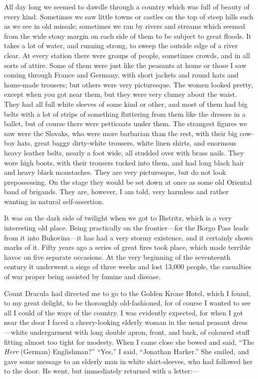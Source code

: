 \documentclass{article}
\begin{document}
				All day long we seemed to dawdle through a country which was full of beauty of every kind. Sometimes we saw little towns or castles on the top of steep hills such as we see in old missals; sometimes we ran by rivers and streams which seemed from the wide stony margin on each side of them to be subject to great floods. It takes a lot of water, and running strong, to sweep the outside edge of a river clear. At every station there were groups of people, sometimes crowds, and in all sorts of attire. Some of them were just like the peasants at home or those I saw coming through France and Germany, with short jackets and round hats and home-made trousers; but others were very picturesque. The women looked pretty, except when you got near them, but they were very clumsy about the waist. They had all full white sleeves of some kind or other, and most of them had big belts with a lot of strips of something fluttering from them like the dresses in a ballet, but of course there were petticoats under them. The strangest figures we saw were the Slovaks, who were more barbarian than the rest, with their big cow-boy hats, great baggy dirty-white trousers, white linen shirts, and enormous heavy leather belts, nearly a foot wide, all studded over with brass nails. They wore high boots, with their trousers tucked into them, and had long black hair and heavy black moustaches. They are very picturesque, but do not look prepossessing. On the stage they would be set down at once as some old Oriental band of brigands. They are, however, I am told, very harmless and rather wanting in natural self-assertion.\par\bigskip
				
				It was on the dark side of twilight when we got to Bistritz, which is a very interesting old place. Being practically on the frontier—for the Borgo Pass leads from it into Bukovina—it has had a very stormy existence, and it certainly shows marks of it. Fifty years ago a series of great fires took place, which made terrible havoc on five separate occasions. At the very beginning of the seventeenth century it underwent a siege of three weeks and lost 13,000 people, the casualties of war proper being assisted by famine and disease.\par\bigskip
				
				Count Dracula had directed me to go to the Golden Krone Hotel, which I found, to my great delight, to be thoroughly old-fashioned, for of course I wanted to see all I could of the ways of the country. I was evidently expected, for when I got near the door I faced a cheery-looking elderly woman in the usual peasant dress—white undergarment with long double apron, front, and back, of coloured stuff fitting almost too tight for modesty. When I came close she bowed and said, “The \textit{Herr} (German) Englishman?” “Yes,” I said, “Jonathan Harker.” She smiled, and gave some message to an elderly man in white shirt-sleeves, who had followed her to the door. He went, but immediately returned with a letter:—\par\bigskip
				
\end{document}
